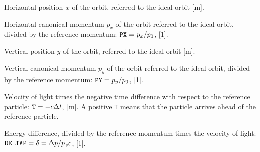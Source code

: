 \begin{mylist}
Horizontal position \(x\) of the orbit, referred to the ideal orbit [m].

Horizontal canonical momentum \(p_{x}\) of the orbit
referred to the ideal orbit, divided by the reference momentum:
\(\hbox{\tt PX}=p_{x}/p_{0}\), [1].

Vertical position \(y\) of the orbit, referred to the ideal orbit [m].

Vertical canonical momentum \(p_{y}\) of the orbit
referred to the ideal orbit, divided by the reference momentum:
\(\hbox{\tt PY}=p_{y}/p_{0}\), [1].

Velocity of light times the negative time difference
with respect to the reference particle:
\(\hbox{\tt T}=-c\Delta t\), [m].
A positive {\tt T} means that the particle arrives ahead
of the reference particle.

Energy difference,
divided by the reference momentum times the velocity of light:
\(\hbox{\tt DELTAP}=\delta =\Delta p/p_sc\), [1].
\end{mylist}
 
